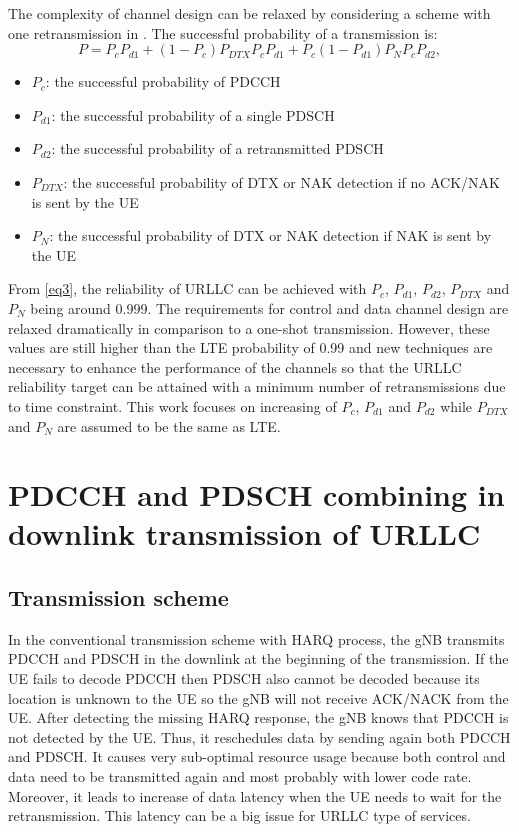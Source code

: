 \documentclass[conference]{IEEEtran}
\begin{document}
The complexity of channel design can be relaxed by considering a scheme with one retransmission in \cite{b7}. The successful probability of a transmission is:
\begin{equation}
P = P_{c}P_{d1} + (1-P_{c})P_{DTX}P_{c}P_{d1} + P_{c}(1-P_{d1})P_{N}P_{c}P_{d2},\label{eq3}
\end{equation}
\begin{itemize}
    \item $P_{c}$: the successful probability of PDCCH
    \item $P_{d1}$: the successful probability of a single PDSCH
    \item $P_{d2}$: the successful probability of a retransmitted PDSCH
    \item $P_{DTX}$: the successful probability of DTX or NAK detection if no ACK/NAK is sent by the UE
    \item $P_{N}$: the successful probability of DTX or NAK detection if NAK is sent by the UE
\end{itemize}

From \eqref{eq3}, the reliability of URLLC can be achieved with $P_{c}$, $P_{d1}$, $P_{d2}$, $P_{DTX}$ and $P_{N}$ being around 0.999. The requirements for control and data channel design are relaxed dramatically in comparison to a one-shot transmission. However, these values are still higher than the LTE probability of 0.99 and new techniques are necessary to enhance the performance of the channels so that the URLLC reliability target can be attained with a minimum number of retransmissions due to time constraint. This work focuses on increasing of $P_{c}$, $P_{d1}$ and $P_{d2}$ while $P_{DTX}$ and $P_{N}$ are assumed to be the same as LTE.

\section{PDCCH and PDSCH combining in downlink transmission of URLLC}

\subsection{Transmission scheme}\label{AA}
In the conventional transmission scheme with HARQ process, the gNB transmits PDCCH and PDSCH in the downlink at the beginning of the transmission. If the UE fails to decode PDCCH then PDSCH also cannot be decoded because its location is unknown to the UE so the gNB will not receive ACK/NACK from the UE. After detecting the missing HARQ response, the gNB knows that PDCCH is not detected by the UE. Thus, it reschedules data by sending again both PDCCH and PDSCH. It causes very sub-optimal resource usage because both control and data need to be transmitted again and most probably with lower code rate. Moreover, it leads to increase of data latency when the UE needs to wait for the retransmission. This latency can be a big issue for URLLC type of services. 
\end{document}
